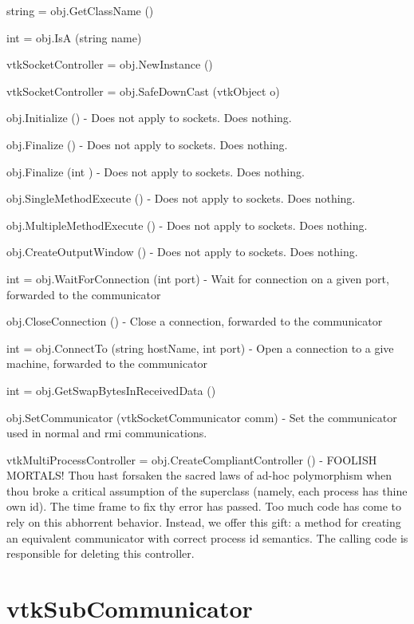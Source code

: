 \begin{DoxyItemize}
\item {\ttfamily string = obj.\-Get\-Class\-Name ()}  
\item {\ttfamily int = obj.\-Is\-A (string name)}  
\item {\ttfamily vtk\-Socket\-Controller = obj.\-New\-Instance ()}  
\item {\ttfamily vtk\-Socket\-Controller = obj.\-Safe\-Down\-Cast (vtk\-Object o)}  
\item {\ttfamily obj.\-Initialize ()} -\/ Does not apply to sockets. Does nothing.  
\item {\ttfamily obj.\-Finalize ()} -\/ Does not apply to sockets. Does nothing.  
\item {\ttfamily obj.\-Finalize (int )} -\/ Does not apply to sockets. Does nothing.  
\item {\ttfamily obj.\-Single\-Method\-Execute ()} -\/ Does not apply to sockets. Does nothing.  
\item {\ttfamily obj.\-Multiple\-Method\-Execute ()} -\/ Does not apply to sockets. Does nothing.  
\item {\ttfamily obj.\-Create\-Output\-Window ()} -\/ Does not apply to sockets. Does nothing.  
\item {\ttfamily int = obj.\-Wait\-For\-Connection (int port)} -\/ Wait for connection on a given port, forwarded to the communicator  
\item {\ttfamily obj.\-Close\-Connection ()} -\/ Close a connection, forwarded to the communicator  
\item {\ttfamily int = obj.\-Connect\-To (string host\-Name, int port)} -\/ Open a connection to a give machine, forwarded to the communicator  
\item {\ttfamily int = obj.\-Get\-Swap\-Bytes\-In\-Received\-Data ()}  
\item {\ttfamily obj.\-Set\-Communicator (vtk\-Socket\-Communicator comm)} -\/ Set the communicator used in normal and rmi communications.  
\item {\ttfamily vtk\-Multi\-Process\-Controller = obj.\-Create\-Compliant\-Controller ()} -\/ F\-O\-O\-L\-I\-S\-H M\-O\-R\-T\-A\-L\-S! Thou hast forsaken the sacred laws of ad-\/hoc polymorphism when thou broke a critical assumption of the superclass (namely, each process has thine own id). The time frame to fix thy error has passed. Too much code has come to rely on this abhorrent behavior. Instead, we offer this gift\-: a method for creating an equivalent communicator with correct process id semantics. The calling code is responsible for deleting this controller.  
\end{DoxyItemize}\hypertarget{vtkparallel_vtksubcommunicator}{}\section{vtk\-Sub\-Communicator}\label{vtkparallel_vtksubcommunicator}
